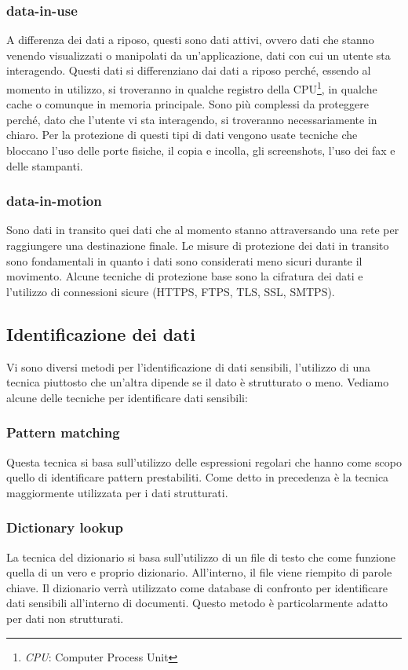     \subsubsection{data-in-use}
        A differenza dei dati a riposo, questi sono dati attivi, ovvero dati che stanno venendo
        visualizzati o manipolati da un'applicazione, dati con cui un utente sta interagendo. 
        Questi dati si differenziano dai dati a riposo perché, essendo al momento in utilizzo, 
        si troveranno in qualche registro della CPU\footnote{\textit{CPU}: Computer Process Unit}, in qualche cache 
        o comunque in memoria principale. Sono più complessi da proteggere perché, dato che l'utente vi sta
        interagendo, si troveranno necessariamente in chiaro. Per la protezione di questi tipi di dati
        vengono usate tecniche che bloccano l'uso delle porte fisiche, il copia e incolla, gli screenshots, l'uso dei fax
        e delle stampanti.

    \subsubsection{data-in-motion}
        Sono dati in transito quei dati che al momento stanno attraversando una rete per raggiungere 
        una destinazione finale. Le misure di protezione dei dati in transito sono fondamentali in quanto
        i dati sono considerati meno sicuri durante il movimento.
        Alcune tecniche di protezione base sono la cifratura dei dati
        e l'utilizzo di connessioni sicure (HTTPS, FTPS, TLS, SSL, SMTPS).

\subsection{Identificazione dei dati}
    Vi sono diversi metodi per l'identificazione di dati sensibili, l'utilizzo di una tecnica piuttosto che
    un'altra dipende se il dato è strutturato o meno. Vediamo alcune delle tecniche per identificare
    dati sensibili:
    \subsubsection{Pattern matching}
    Questa tecnica si basa sull'utilizzo delle espressioni regolari che hanno come scopo quello
    di identificare pattern prestabiliti. Come detto in precedenza è la tecnica maggiormente 
    utilizzata per i dati strutturati. 

    \subsubsection{Dictionary lookup}
    La tecnica del dizionario si basa sull'utilizzo di un file di testo che come funzione quella
    di un vero e proprio dizionario. All'interno, il file viene riempito di parole chiave. 
    Il dizionario verrà utilizzato come database di confronto per identificare dati sensibili all'interno 
    di documenti. Questo metodo è particolarmente adatto per dati non strutturati.

